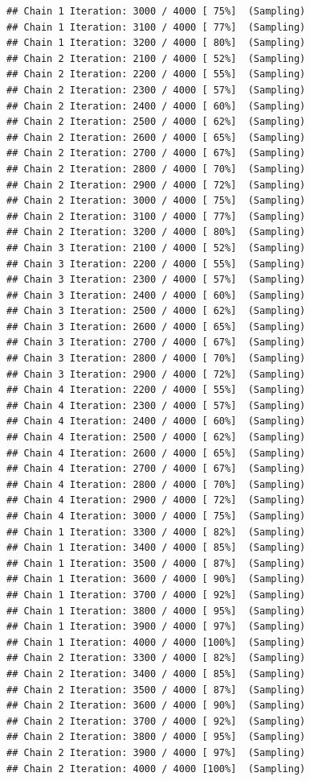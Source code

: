 \documentclass[
]{article}
\begin{document}
\begin{verbatim}
## Chain 1 Iteration: 3000 / 4000 [ 75%]  (Sampling) 
## Chain 1 Iteration: 3100 / 4000 [ 77%]  (Sampling) 
## Chain 1 Iteration: 3200 / 4000 [ 80%]  (Sampling) 
## Chain 2 Iteration: 2100 / 4000 [ 52%]  (Sampling) 
## Chain 2 Iteration: 2200 / 4000 [ 55%]  (Sampling) 
## Chain 2 Iteration: 2300 / 4000 [ 57%]  (Sampling) 
## Chain 2 Iteration: 2400 / 4000 [ 60%]  (Sampling) 
## Chain 2 Iteration: 2500 / 4000 [ 62%]  (Sampling) 
## Chain 2 Iteration: 2600 / 4000 [ 65%]  (Sampling) 
## Chain 2 Iteration: 2700 / 4000 [ 67%]  (Sampling) 
## Chain 2 Iteration: 2800 / 4000 [ 70%]  (Sampling) 
## Chain 2 Iteration: 2900 / 4000 [ 72%]  (Sampling) 
## Chain 2 Iteration: 3000 / 4000 [ 75%]  (Sampling) 
## Chain 2 Iteration: 3100 / 4000 [ 77%]  (Sampling) 
## Chain 2 Iteration: 3200 / 4000 [ 80%]  (Sampling) 
## Chain 3 Iteration: 2100 / 4000 [ 52%]  (Sampling) 
## Chain 3 Iteration: 2200 / 4000 [ 55%]  (Sampling) 
## Chain 3 Iteration: 2300 / 4000 [ 57%]  (Sampling) 
## Chain 3 Iteration: 2400 / 4000 [ 60%]  (Sampling) 
## Chain 3 Iteration: 2500 / 4000 [ 62%]  (Sampling) 
## Chain 3 Iteration: 2600 / 4000 [ 65%]  (Sampling) 
## Chain 3 Iteration: 2700 / 4000 [ 67%]  (Sampling) 
## Chain 3 Iteration: 2800 / 4000 [ 70%]  (Sampling) 
## Chain 3 Iteration: 2900 / 4000 [ 72%]  (Sampling) 
## Chain 4 Iteration: 2200 / 4000 [ 55%]  (Sampling) 
## Chain 4 Iteration: 2300 / 4000 [ 57%]  (Sampling) 
## Chain 4 Iteration: 2400 / 4000 [ 60%]  (Sampling) 
## Chain 4 Iteration: 2500 / 4000 [ 62%]  (Sampling) 
## Chain 4 Iteration: 2600 / 4000 [ 65%]  (Sampling) 
## Chain 4 Iteration: 2700 / 4000 [ 67%]  (Sampling) 
## Chain 4 Iteration: 2800 / 4000 [ 70%]  (Sampling) 
## Chain 4 Iteration: 2900 / 4000 [ 72%]  (Sampling) 
## Chain 4 Iteration: 3000 / 4000 [ 75%]  (Sampling) 
## Chain 1 Iteration: 3300 / 4000 [ 82%]  (Sampling) 
## Chain 1 Iteration: 3400 / 4000 [ 85%]  (Sampling) 
## Chain 1 Iteration: 3500 / 4000 [ 87%]  (Sampling) 
## Chain 1 Iteration: 3600 / 4000 [ 90%]  (Sampling) 
## Chain 1 Iteration: 3700 / 4000 [ 92%]  (Sampling) 
## Chain 1 Iteration: 3800 / 4000 [ 95%]  (Sampling) 
## Chain 1 Iteration: 3900 / 4000 [ 97%]  (Sampling) 
## Chain 1 Iteration: 4000 / 4000 [100%]  (Sampling) 
## Chain 2 Iteration: 3300 / 4000 [ 82%]  (Sampling) 
## Chain 2 Iteration: 3400 / 4000 [ 85%]  (Sampling) 
## Chain 2 Iteration: 3500 / 4000 [ 87%]  (Sampling) 
## Chain 2 Iteration: 3600 / 4000 [ 90%]  (Sampling) 
## Chain 2 Iteration: 3700 / 4000 [ 92%]  (Sampling) 
## Chain 2 Iteration: 3800 / 4000 [ 95%]  (Sampling) 
## Chain 2 Iteration: 3900 / 4000 [ 97%]  (Sampling) 
## Chain 2 Iteration: 4000 / 4000 [100%]  (Sampling) 

\end{verbatim}
\end{document}
